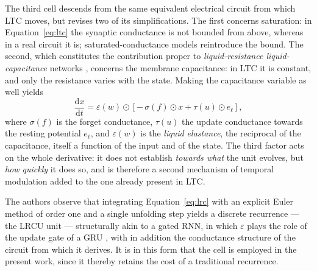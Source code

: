 The third cell descends from the same equivalent electrical circuit from which
LTC moves, but revises two of its simplifications. The first concerns
saturation: in Equation~\eqref{eq:ltc} the synaptic conductance is not bounded
from above, whereas in a real circuit it is; saturated-conductance models
reintroduce the bound. The second, which constitutes the contribution proper to
\emph{liquid-resistance liquid-capacitance} networks \cite{farsang2024lrc},
concerns the membrane capacitance: in LTC it is constant, and only the
resistance varies with the state. Making the capacitance variable as well yields
\begin{equation}
  \frac{\mathrm{d}x}{\mathrm{d}t}
    = \varepsilon(w) \odot \left[-\,\sigma(f)\odot x + \tau(u) \odot e_{\ell}\right],
  \label{eq:lrc}
\end{equation}
where $\sigma(f)$ is the forget conductance, $\tau(u)$ the update conductance
towards the resting potential $e_{\ell}$, and $\varepsilon(w)$ is the
\emph{liquid elastance}, the reciprocal of the capacitance, itself a function of
the input and of the state. The third factor acts on the whole derivative: it
does not establish \emph{towards what} the unit evolves, but \emph{how quickly}
it does so, and is therefore a second mechanism of temporal modulation added to
the one already present in LTC.

The authors observe that integrating Equation~\eqref{eq:lrc} with an explicit
Euler method of order one and a single unfolding step yields a discrete
recurrence --- the LRCU unit --- structurally akin to a gated RNN, in which
$\varepsilon$ plays the role of the update gate of a GRU \cite{cho2014gru},
with in addition the conductance structure of the circuit from which it derives.
It is in this form that the cell is employed in the present work, since it
thereby retains the cost of a traditional recurrence.

